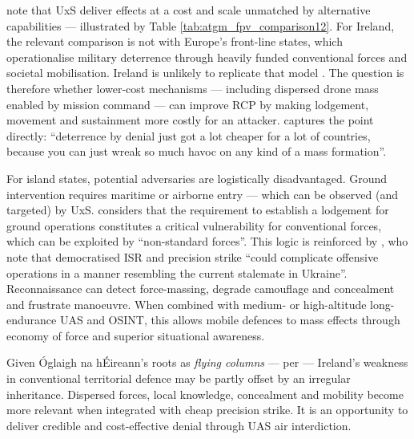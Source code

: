 \textcite{BRONK_2024} note that UxS deliver effects at a cost and scale unmatched by alternative capabilities --- illustrated by Table \ref{tab:atgm_fpv_comparison12}. For Ireland, the relevant comparison is not with Europe’s front-line states, which operationalise military deterrence through heavily funded conventional forces and societal mobilisation. Ireland is unlikely to replicate that model \parencite[135--148]{CODF_2022}. The question is therefore whether lower-cost mechanisms --- including dispersed drone mass enabled by mission command --- can improve RCP by making lodgement, movement and sustainment more costly for an attacker. \textcite{erikdavis_participant_7} captures the point directly: ``deterrence by denial just got a lot cheaper for a lot of countries, because you can just wreak so much havoc on any kind of a mass formation''. 

For island states, potential adversaries are logistically disadvantaged. Ground intervention requires maritime or airborne entry --- which can be observed (and targeted) by UxS. \textcite{erikdavis_participant_7} considers that the requirement to establish a lodgement for ground operations constitutes a critical vulnerability for conventional forces, which can be exploited by ``non-standard forces''.  This logic is reinforced by \textcite[22]{hvizda_2025}, who note that democratised ISR and precision strike ``could complicate offensive operations in a manner resembling the current stalemate in Ukraine''. Reconnaissance can detect force-massing, degrade camouflage and concealment and frustrate manoeuvre. When combined with medium- or high-altitude long-endurance UAS and OSINT, this allows mobile defences to mass effects through economy of force and superior situational awareness.

Given \'{O}glaigh na h\'{E}ireann's roots as \emph{flying columns} --- per \textcite{tombarry,Omalley_1,Omalley_2} --- Ireland’s weakness in conventional territorial defence may be partly offset by an irregular inheritance. Dispersed forces, local knowledge, concealment and mobility become more relevant when integrated with cheap precision strike. It is an opportunity to deliver credible and cost-effective denial through UAS air interdiction.










